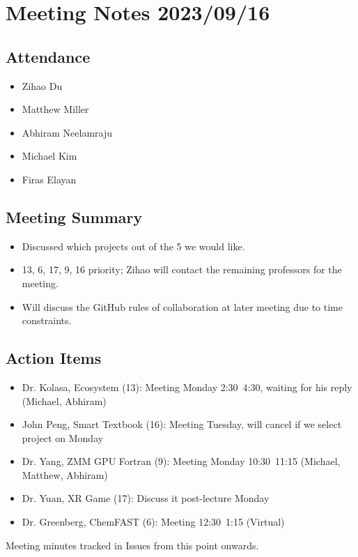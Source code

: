 \documentclass{article}
\begin{document}
\section*{Meeting Notes 2023/09/16}

\subsection*{Attendance}
\begin{itemize}
\item Zihao Du 
\item Matthew Miller
\item Abhiram Neelamraju
\item Michael Kim
\item Firas Elayan
\end{itemize}

\subsection*{Meeting Summary}
\begin{itemize}
\item Discussed which projects out of the 5 we would like.
\item 13, 6, 17, 9, 16 priority; Zihao will contact the remaining professors for the meeting.
\item Will discuss the GitHub rules of collaboration at later meeting due to time constraints.
\end{itemize}

\subsection*{Action Items}
\begin{itemize}
\item Dr. Kolasa, Ecosystem (13): Meeting Monday 2:30~4:30, waiting for his reply (Michael, Abhiram)
\item John Peng, Smart Textbook (16): Meeting Tuesday, will cancel if we select project on Monday
\item Dr. Yang, ZMM GPU Fortran (9): Meeting Monday 10:30~11:15 (Michael, Matthew, Abhiram)
\item Dr. Yuan, XR Game (17): Discuss it post-lecture Monday
\item Dr. Greenberg, ChemFAST (6): Meeting 12:30~1:15 (Virtual)
\end{itemize}

Meeting minutes tracked in Issues from this point onwards.
\end{document}
